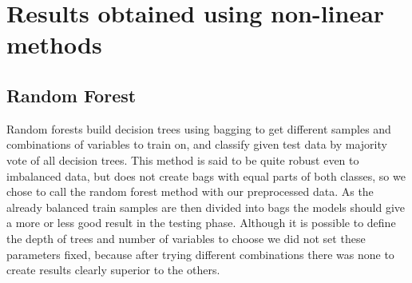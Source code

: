 
\section{Results obtained using non-linear methods}

\subsection{Random Forest}


Random forests build decision trees using bagging to get different samples and combinations of variables to train on, and classify given test data by majority vote of all decision trees. This method is said to be quite robust even to imbalanced data, but does not create bags with equal parts of both classes, so we chose to call the random forest method with our preprocessed data. As the already balanced train samples are then divided into bags the models should give a more or less good result in the testing phase. Although it is possible to define the depth of trees and number of variables to choose we did not set these parameters fixed, because after trying different combinations there was none to create results clearly superior to the others.

